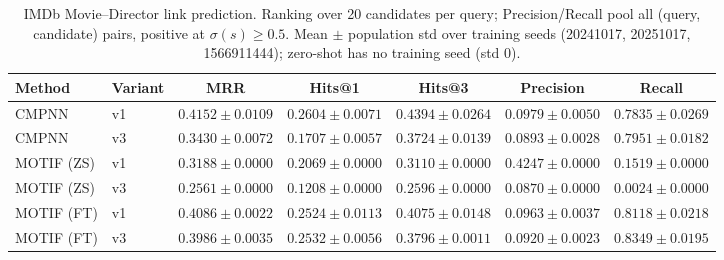 \begin{table}[t]
\centering
\small
\begin{tabular}{||l||l||c|c|c||c|c||}
\hline
\textbf{Method} & \textbf{Variant} & \textbf{MRR} & \textbf{Hits@1} & \textbf{Hits@3} & \textbf{Precision} & \textbf{Recall} \\
\hline\hline
CMPNN & v1 & $0.4152 \pm 0.0109$ & $0.2604 \pm 0.0071$ & $0.4394 \pm 0.0264$ & $0.0979 \pm 0.0050$ & $0.7835 \pm 0.0269$ \\
\hline
CMPNN & v3 & $0.3430 \pm 0.0072$ & $0.1707 \pm 0.0057$ & $0.3724 \pm 0.0139$ & $0.0893 \pm 0.0028$ & $0.7951 \pm 0.0182$ \\
\hline
\hline
MOTIF (ZS) & v1 & $0.3188 \pm 0.0000$ & $0.2069 \pm 0.0000$ & $0.3110 \pm 0.0000$ & $0.4247 \pm 0.0000$ & $0.1519 \pm 0.0000$ \\
\hline
MOTIF (ZS) & v3 & $0.2561 \pm 0.0000$ & $0.1208 \pm 0.0000$ & $0.2596 \pm 0.0000$ & $0.0870 \pm 0.0000$ & $0.0024 \pm 0.0000$ \\
\hline
\hline
MOTIF (FT) & v1 & $0.4086 \pm 0.0022$ & $0.2524 \pm 0.0113$ & $0.4075 \pm 0.0148$ & $0.0963 \pm 0.0037$ & $0.8118 \pm 0.0218$ \\
\hline
MOTIF (FT) & v3 & $0.3986 \pm 0.0035$ & $0.2532 \pm 0.0056$ & $0.3796 \pm 0.0011$ & $0.0920 \pm 0.0023$ & $0.8349 \pm 0.0195$ \\
\hline
\end{tabular}
\caption{IMDb Movie--Director link prediction. Ranking over 20 candidates per query; Precision/Recall pool all (query, candidate) pairs, positive at $\sigma(s) \geq 0.5$. Mean $\pm$ population std over training seeds (20241017, 20251017, 1566911444); zero-shot has no training seed (std 0). }
\label{tab:imdb_movie_director_seed_performance}
\end{table}
